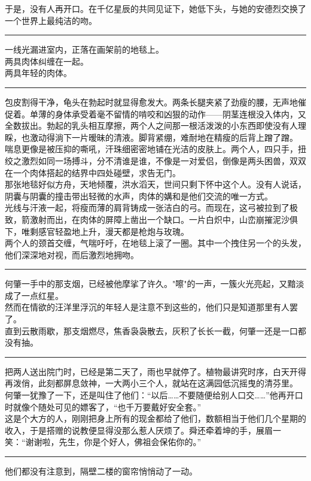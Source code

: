 \documentclass[oneside,11pt]{memoir} %
\begin{document}
\begin{CJK}{UTF8}{gbsn}
    于是，没有人再开口。在千亿星辰的共同见证下，她低下头，与她的安德烈交换了一个世界上最纯洁的吻。\\\indent
\rule{-3pt}{30pt}
    一线光漏进室内，正落在画架前的地毯上。\\\indent
    两具肉体纠缠在一起。\\\indent
    两具年轻的肉体。\\\indent
\rule{-3pt}{30pt}
    包皮割得干净，龟头在勃起时就显得愈发大。两条长腿夹紧了劲瘦的腰，无声地催促着。单薄的身体承受着毫不留情的啃咬和凶狠的动作——阴茎连根没入体内，又全数拔出。勃起的乳头相互摩擦，两个人之间那一根活泼泼的小东西即使没有人理睬，也激动得淌下一片暧昧的清液。脚背紧绷，难耐地在精瘦的后背上蹭了蹭。\\\indent
    喘息更像是被压抑的嘶吼，汗珠细密密地铺在光洁的皮肤上。两个人，四只手，扭绞之激烈如同一场搏斗，分不清谁是谁，不像是一对爱侣，倒像是两头困兽，双双在一个肉体搭起的结界中四处碰壁，求告无门。\\\indent
    那张地毯好似方舟，天地倾覆，洪水滔天，世间只剩下怀中这个人。没有人说话，阴囊与阴囊的撞击带出轻微的水声，肉体的媾和是他们交流的唯一方式。\\\indent
    光线与汗液一起，将瘦而薄的肩背铸成一张洁白的弓。而现在，这弓被拉到了极致，箭激射而出，在肉体的屏障上凿出一个缺口。一片白炽中，山峦崩摧泥沙俱下，唯剩感官轻盈地上升，漫天都是枪炮与玫瑰。\\\indent
    两个人的颈首交缠，气喘吁吁，在地毯上滚了一圈。其中一个拽住另一个的头发，他们深深地对视，而后激烈地拥吻。\\\indent
 \rule{-3pt}{30pt}    
    何肇一手中的那支烟，已经被他摩挲了许久。"嚓"的一声，一簇火光亮起，又黯淡成了一点红星。\\\indent
    然而在情欲的汪洋里浮沉的年轻人是注意不到这些的，他们只是知道那里有人罢了。\\\indent
    直到云散雨歇，那支烟燃尽，焦香袅袅散去，灰积了长长一截，何肇一还是一口都没有抽。   \\\indent
\rule{-3pt}{30pt}
    把两人送出院门时，已经是第二天了，雨也早就停了。植物最讲究时序，白天开得再泼俏，此刻都屏息敛神，一大两小三个人，就站在这满园低沉摇曳的清芬里。\\\indent
    何肇一犹豫了一下，还是叫住了他们：“以后……不要随便给别人口交……”他再开口时就像个随处可见的嫖客了，“也千万要戴好安全套。”\\\indent
    这是个大方的人，刚刚把身上所有的现金都给了他们，数额相当于他们几个星期的收入，于是搭赠的说教便显得没那么惹人厌烦了。舜还牵着坤的手，展眉一笑：“谢谢啦，先生，你是个好人，佛祖会保佑你的。”\\\indent
\rule{-3pt}{30pt}
    他们都没有注意到，隔壁二楼的窗帘悄悄动了一动。\\\indent


\end{CJK}
\end{document}
